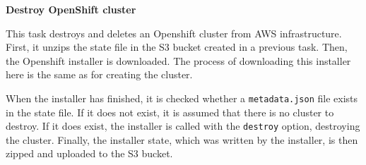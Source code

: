 \textbf{Destroy OpenShift cluster}

This task destroys and deletes an Openshift cluster from AWS infrastructure.
First, it unzips the state file in the S3 bucket created in a previous task.
Then, the Openshift installer is downloaded.
The process of downloading this installer here is the same as for creating the cluster.

When the installer has finished, it is checked whether a \verb|metadata.json| file exists in the state file.
If it does not exist, it is assumed that there is no cluster to destroy.
If it does exist, the installer is called with the \verb|destroy| option, destroying the cluster.
Finally, the installer state, which was written by the installer, is then zipped and uploaded to the S3 bucket.
